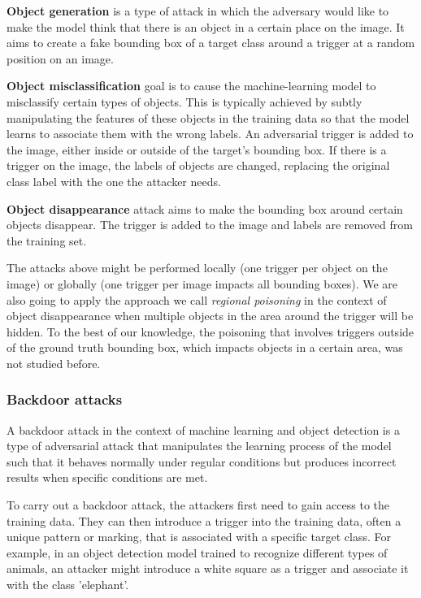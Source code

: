 \documentclass[14pt,a4paper]{extarticle}
\newcounter{e}
\newcounter{pic}
\numberwithin{equation}{section}
\numberwithin{figure}{section}
\begin{document}
\textbf{Object generation} is a type of attack in which the adversary would like to make the model think that there is an object in a certain place on the image. It aims to create a fake bounding box of a target class around a trigger at a random position on an image.

\textbf{Object misclassification} goal is to cause the machine-learning model to misclassify certain types of objects. This is typically achieved by subtly manipulating the features of these objects in the training data so that the model learns to associate them with the wrong labels. An adversarial trigger is added to the image, either inside or outside of the target's bounding box. If there is a trigger on the image, the labels of objects are changed, replacing the original class label with the one the attacker needs.

\textbf{Object disappearance} attack aims to make the bounding box around certain objects disappear. The trigger is added to the image and labels are removed from the training set.

The attacks above might be performed locally (one trigger per object on the image) or globally (one trigger per image impacts all bounding boxes). We are also going to apply the approach we call \textit{regional poisoning} in the context of object disappearance when multiple objects in the area around the trigger will be hidden. To the best of our knowledge, the poisoning that involves triggers outside of the ground truth bounding box, which impacts objects in a certain area, was not studied before.


\subsubsection{Backdoor attacks}
A backdoor attack in the context of machine learning and object detection is a type of adversarial attack that manipulates the learning process of the model such that it behaves normally under regular conditions but produces incorrect results when specific conditions are met.

To carry out a backdoor attack, the attackers first need to gain access to the training data. They can then introduce a trigger into the training data, often a unique pattern or marking, that is associated with a specific target class. For example, in an object detection model trained to recognize different types of animals, an attacker might introduce a white square as a trigger and associate it with the class 'elephant'.
\end{document}
